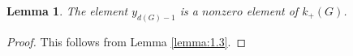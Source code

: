 \documentclass[11pt,showkeys]{article}
\theoremstyle{theorem}
\newtheorem{lem}[theorem]{Lemma}
\theoremstyle{definition}
\def\bQ{{\mathbb Q}}
\def\CalO{{\mathcal O}}
\def\Ker{{\mbox{Ker}}}
\begin{document}
\begin{lem}\label{lemma:1.4} 
The element $y_{d(G)-1}$ is a $nonzero$ element of $k_{+}(G)$. 
\end{lem}
\begin{proof} 
This follows from Lemma \ref{lemma:1.3}. 
\begin{comment}
From the relation (\ref{lemma:1.3:eq:1}) in the proof of Lemma \ref{lemma:1.3}, $y_0$ and $y_1$ are linearly dependent. Suppose that $y_{d-1} = 0$. Since $y_0$ and $y_1$ are linearly dependent and $y_{d-1} = 0$, the dimension of the subspace spanned by $y_0, \dots, y_d$ is less than $(d+1)-2 = d-1$. From Lemma \ref{lemma:1.3} and the previous discussion, the dimension of $k_+(G)$ is less than $d-1$. This contradicts Lemma \ref{lemma:1.2}. 
First, we assume that $y_{d(G)-1} = 0$ and $d(G) = 2$. Since $\Ker(\CalO^{\times}(G) \rightarrow k_{+}(G)) = \CalO^{\prec 1}(G)_{\rm tor}$ [cf. \cite{Hoshi1}, Lemma 1.2, (v)], we conclude from the assumption that $y_{d(G) - 1} = 0$ that $x_{d(G)-1} \in \CalO^{\prec 1}(G)_{\rm tor}$. Thus, $z_{d(G)-1} = z_1$ is the identity element. In paticular, it follows from the condition of ${\{z_i\} }_{i \in S}$ [cf. Lemma \ref{lemma:1.3}] that $z_0$ is the identity element. Thus, $y_2$ is the only nontrivial element of ${\{y_i\} }_{i \in S}$. However this contradicts the fact that $k_{+}(G)$ is a $\bQ_{p(G)}$-vector space of dimension 2 [cf. \cite{Hoshi1}, Proposition 3.11, (iv)]. 
Next, we assume that $y_{d(G)-1} = 0$ and $d(G) > 2$. Since $y_0$ and $y_1$ are linearly dependent [cf. the relation (\ref{lemma:1.3:eq:1}) in the proof of Lemma \ref{lemma:1.3}], and $y_{d(G)-1} = 0$, the number of linearly independent elements of ${\{y_i\} }_{i \in S}$ is less than $d(G)-1$. It contradicts the fact that $k_{+}(G)$ is a $\bQ_{p(G)}$-vector space of dimension $d(G)$ [cf. \cite{Hoshi1}, Proposition 3.11, (iv)]. Since $y_{d(G)-1} = 0$, together with Lemma \ref{lemma:1.3}, ${\{y_i\} }_{i \in S \backslash (d(G)-1)}$ is a basis of the $\bQ_{p(G)}$-vector space $k_{+}(G)$. However, since $y_0$ and $y_1$ are linearly dependent [cf. the relation (\ref{lemma:1.3:eq:1}) in the proof of Lemma \ref{lemma:1.3}], ${\{y_i\} }_{i \in S \backslash (d(G)-1)}$ is not a basis of the $\bQ_{p(G)}$-vector space $k_{+}(G)$. This is cleary a contradiction.  
\end{comment}
\end{proof}
\end{document}
